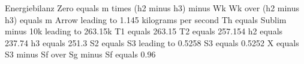 Energiebilanz  
Zero equals m times (h2 minus h3) minus Wk  
Wk over (h2 minus h3) equals m  
Arrow leading to 1.145 kilograms per second  
Th equals Sublim minus 10k leading to 263.15k  
T1 equals 263.15  
T2 equals 257.154  
h2 equals 237.74  
h3 equals 251.3  
S2 equals S3 leading to 0.5258  
S3 equals 0.5252  
X equals S3 minus Sf over Sg minus Sf equals 0.96